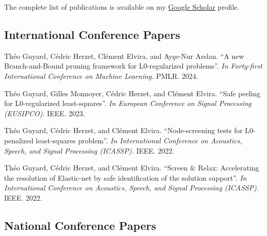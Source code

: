 The complete list of publications is available on my \href{https://scholar.google.com/citations?user=xwtKGaEAAAAJ&hl=en}{Google Scholar} profile.

\subsection*{International Conference Papers}
\label{publications:international-conference-papers}

\begin{etaremune}
    \item Théo Guyard, Cédric Herzet, Clément Elvira, and Ay\c{s}e-Nur Arslan. ``A new Branch-and-Bound pruning framework for L0-regularized problems''. \textit{In Forty-first International Conference on Machine Learning.} PMLR. 2024.
    \item Théo Guyard, Gilles Monnoyer, Cédric Herzet,  and Clément Elvira. ``Safe peeling for L0-regularized least-squares''. \textit{In European Conference on Signal Processing (EUSIPCO).} IEEE. 2023.
    \item Théo Guyard, Cédric Herzet, and Clément Elvira. ``Node-screening tests for L0-penalized least-squares problem''. \textit{In International Conference on Acoustics, Speech, and Signal Processing (ICASSP).} IEEE. 2022.
    \item Théo Guyard, Cédric Herzet, and Clément Elvira. ``Screen \& Relax: Accelerating the resolution of Elastic-net by safe identification of the solution support''. \textit{In International Conference on Acoustics, Speech, and Signal Processing (ICASSP).} IEEE. 2022.
\end{etaremune}

\subsection*{National Conference Papers}
\label{publications:national-conference-papers}

